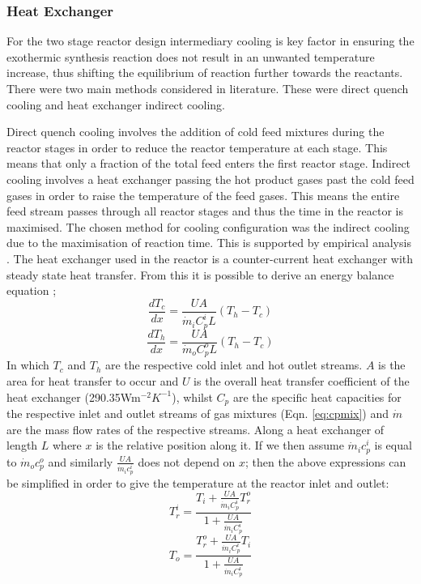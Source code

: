 \subsubsection{Heat Exchanger}

For the two stage reactor design intermediary cooling is key factor in ensuring the exothermic synthesis reaction does not result in an unwanted temperature increase, thus shifting the equilibrium of reaction further towards the reactants. There were two main methods considered in literature. These were direct quench cooling and heat exchanger indirect cooling.

Direct quench cooling involves the addition of cold feed mixtures during the reactor stages in order to reduce the reactor temperature at each stage. This means that only a fraction of the total feed enters the first reactor stage.
Indirect cooling involves a heat exchanger passing the hot product gases past the cold feed gases in order to raise the temperature of the feed gases. This means the entire feed stream passes through all reactor stages and thus the time in the reactor is maximised.
The chosen method for cooling configuration was the indirect cooling due to the maximisation of reaction time. This is supported by empirical analysis \cite{Penkuhn2017}. The heat exchanger used in the reactor is a counter-current heat exchanger with steady state heat transfer. From this it is possible to derive an energy balance equation \cite{Jinasena2016};
\begin{equation}
\frac{dT_c}{dx}=\frac{UA}{\dot m_i C^i_pL}(T_h-T_c)  
\end{equation}
\begin{equation}
\frac{dT_h}{dx}=\frac{UA}{\dot m_o C^o_pL}(T_h-T_c)
\end{equation}
In which $T_c$ and $T_h$ are the respective cold inlet and hot outlet streams. $A$ is the area for heat transfer to occur and $U$ is the overall heat transfer coefficient of the heat exchanger (290.35Wm$^{-2}K^{-1}$)\cite{Elnashaie1988}, whilst $C_p$ are the specific heat capacities for the respective inlet and outlet streams of gas mixtures (Eqn. \ref{eq:cpmix}) and $\dot m$ are the mass flow rates of the respective streams. Along a heat exchanger of length $L$ where $x$ is the relative position along it. If we then assume $\dot m_i c^i_p$ is equal to $\dot m_o c^o_p$ and similarly $\frac{UA}{\dot m_i c^i_p}$ does not depend on $x$; then the above expressions can be simplified in order to give the temperature at the reactor inlet and outlet:
\begin{equation}
T_r^i = \frac{T_i + \frac{UA}{\dot m_i C^i_p}T_r^o}{1+\frac{UA}{\dot m_i C^i_p}}
\end{equation}
\begin{equation}
T_o = \frac{T_r^o + \frac{UA}{\dot m_i C^i_p}T_i}{1+\frac{UA}{\dot m_i C^i_p}}
\end{equation}

